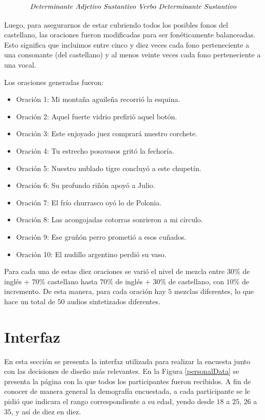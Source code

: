 $$\textnormal{\textit{Determinante Adjetivo Sustantivo Verbo Determinante Sustantivo}}$$

Luego, para asegurarnos de estar cubriendo todos los posibles fonos del castellano, las oraciones fueron modificadas para ser fonéticamente balanceadas. Esto significa que incluimos entre cinco y diez veces cada fono perteneciente a una consonante (del castellano) y al menos veinte veces cada fono perteneciente a una vocal.

Los oraciones generadas fueron:

\begin{itemize}
\item Oración 1: Mi montaña aguileña recorrió la esquina.
\item Oración 2: Aquel fuerte vidrio prefirió aquel botón.
\item Oración 3: Este enjoyado juez comprará nuestro corchete.
\item Oración 4: Tu estrecho posavasos gritó la fechoría.
\item Oración 5: Nuestro nublado tigre concluyó a este chupetín.
\item Oración 6: Su profundo riñón apoyó a Julio.
\item Oración 7: El frío churrasco oyó lo de Polonia.
\item Oración 8: Las acongojadas cotorras sonrieron a mi círculo.
\item Oración 9: Ese gruñón perro prometió a esos cuñados.
\item Oración 10: El nudillo argentino perdió su vaso.
\end{itemize}

Para cada una de estas diez oraciones se varió el nivel de mezcla entre $30\%$ de inglés + $70\%$ castellano hasta $70\%$ de inglés + $30\%$ de castellano, con $10\%$ de incremento. De esta manera, para cada oración hay $5$ mezclas diferentes, lo que hace un total de $50$ audios sintetizados diferentes.

\section{Interfaz}\label{interfaz}

En esta sección se presenta la interfaz utilizada para realizar la encuesta junto con las decisiones de diseño más relevantes. En la Figura \ref{personalData} se presenta la página con la que todos los participantes fueron recibidos. A fin de conocer de manera general la demografía encuestada, a cada participante se le pidió que indicara el rango correspondiente a su edad, yendo desde $18$ a $25$, $26$ a $35$, y así de diez en diez.

